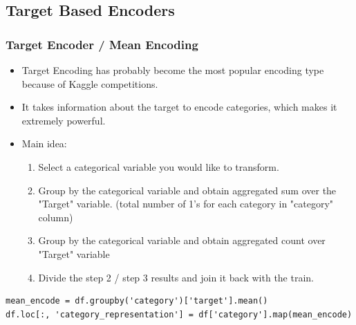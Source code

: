 \documentclass{beamer}
\begin{document}
    \subsection{Target Based Encoders}
    \begin{frame}[fragile]
        \frametitle{Target Encoder / Mean Encoding}
        \begin{itemize}
            \pause
            \item Target Encoding has probably become the most popular encoding type because of
            Kaggle competitions.
            \pause
            \item It takes information about the target to encode categories, which makes it
            extremely powerful.
            \pause
            \item Main idea:
            \begin{enumerate}
                \item Select a categorical variable you would like to transform.
                \pause
                \item Group by the categorical variable and obtain aggregated sum over the
                "Target" variable. (total number of 1's for each category in "category" column)
                \pause
                \item Group by the categorical variable and obtain aggregated count over "Target"
                variable
                \pause
                \item Divide the step 2 / step 3 results and join it back with the train.
            \end{enumerate}
            \pause
        \end{itemize}

        \begin{lstlisting}
mean_encode = df.groupby('category')['target'].mean()
df.loc[:, 'category_representation'] = df['category'].map(mean_encode)
        \end{lstlisting}
    \end{frame}
\end{document}
